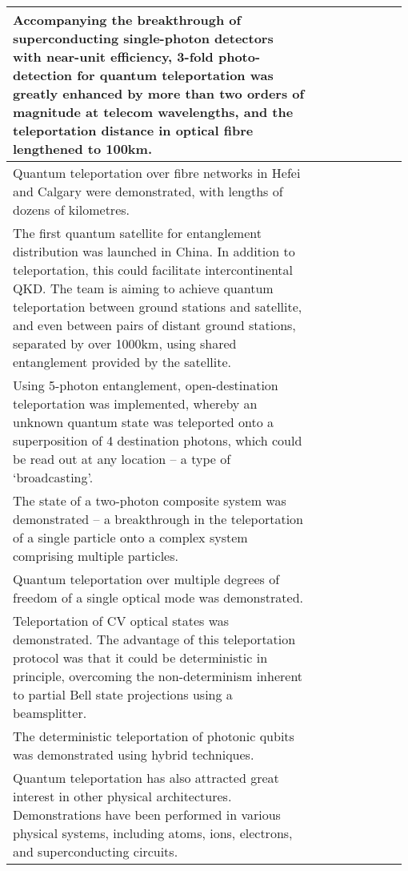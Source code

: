 \begin{table*}[!htbp]
\begin{tabular}{|p{0.755\linewidth}|p{0.22\linewidth}|}
	\hline
	Accompanying the breakthrough of superconducting single-photon detectors with near-unit efficiency, 3-fold photo-detection for quantum teleportation was greatly enhanced by more than two orders of magnitude at telecom wavelengths, and the teleportation distance in optical fibre lengthened to 100km. & \cite{bib:Optica_2_832} \\
	\hline
	Quantum teleportation over fibre networks in Hefei and Calgary were demonstrated, with lengths of dozens of kilometres. & \cite{bib:sun2016quantum, bib:Nat_Phot_10_676} \\
	\hline
	The first quantum satellite for entanglement distribution was launched in China. In addition to teleportation, this could facilitate intercontinental QKD. The team is aiming to achieve quantum teleportation between ground stations and satellite, and even between pairs of distant ground stations, separated by over 1000km, using shared entanglement provided by the satellite. & \cite{bib:Nat_535_478} \\
	\hline
	Using 5-photon entanglement, open-destination teleportation was implemented, whereby an unknown quantum state was teleported onto a superposition of 4 destination photons, which could be read out at any location -- a type of `broadcasting'. & \cite{bib:zhao2004experimental} \\
	\hline
	The state of a two-photon composite system was demonstrated -- a breakthrough in the teleportation of a single particle onto a complex system comprising multiple particles. & \cite{bib:Nat_Phys_2_678} \\
	\hline
	Quantum teleportation over multiple degrees of freedom of a single optical mode was demonstrated. & \cite{bib:Nat_518_516} \\
	\hline
	Teleportation of CV optical states was demonstrated. The advantage of this teleportation protocol was that it could be deterministic in principle,  overcoming the non-determinism inherent to partial Bell state projections using a beamsplitter. & \cite{bib:Science_282_706} \\
	\hline
	The deterministic teleportation of photonic qubits was demonstrated using hybrid techniques. & \cite{bib:Nat_500_315} \\
	\hline
	Quantum teleportation has also attracted great interest in other physical architectures. Demonstrations have been performed in various physical systems, including atoms, ions, electrons, and superconducting circuits. & \cite{bib:Nat_Phys_9_400, bib:Nat_429_734, bib:Nat_429_737, bib:Science_345_532, bib:Nat_500_319} \\

\end{tabular}
\end{table*}
